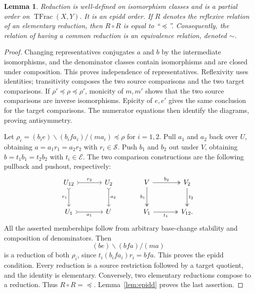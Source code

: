 \documentclass[11pt,reqno,a4paper]{amsart}
\newtheorem{lemma}[theorem]{Lemma}
\theoremstyle{definition}
\theoremstyle{remark}
\newcommand{\0}{\mathbf{0}}
\renewcommand{\1}{\mathbf{1}}
\newcommand{\Sden}{\mathcal S}
\newcommand{\Eden}{\mathcal E}
\DeclareMathOperator{\TFrac}{TFrac}
\begin{document}
\begin{lemma}\label{di:lem:reduction-posets}
Reduction is well-defined on isomorphism classes and is a partial
order on $\TFrac(X,Y)$. It is an epidd order. If $R$ denotes the
reflexive relation of an elementary reduction, then
$R\circ R$ is equal to ``$\preceq$''. Consequently, the relation of having a common reduction is an equivalence relation, denoted $\sim$.
\end{lemma}
\begin{proof}
Changing representatives conjugates $a$ and $b$ by the intermediate
isomorphisms, and the denominator classes contain isomorphisms and
are closed under composition. This proves independence of
representatives. Reflexivity uses identities; transitivity composes
the two source comparisons and the two target comparisons.
If $\rho'\preceq\rho\preceq\rho'$, monicity of $m,m'$ shows that
the two source comparisons are inverse isomorphisms. Epicity of
$e,e'$ gives the same conclusion for the target comparisons.
The numerator equations then identify the diagrams, proving
antisymmetry.

Let $\rho_i=(b_ie)\backslash(b_ifa_i)/(ma_i)\preceq\rho$ for
$i=1,2$. Pull $a_1$ and $a_2$ back over $U$, obtaining
$a=a_1r_1=a_2r_2$ with $r_i\in\Sden$. Push $b_1$ and $b_2$ out
under $V$, obtaining $b=t_1b_1=t_2b_2$ with $t_i\in\Eden$.
The two comparison constructions are the following pullback and
pushout, respectively:
\begin{equation}\label{di:eq:common-reduction-squares}
\begin{tikzcd}[column sep=large,row sep=large]
U_{12}\arrow[r,tail,"r_2"]\arrow[d,tail,"r_1"'] &
 U_2\arrow[d,tail,"a_2"] &
 V\arrow[r,two heads,"b_2"]\arrow[d,two heads,"b_1"'] &
 V_2\arrow[d,two heads,"t_2"]\\
 U_1\arrow[r,tail,"a_1"'] & U &
 V_1\arrow[r,two heads,"t_1"'] & V_{12}.
\end{tikzcd}
\end{equation}
All the asserted memberships follow from arbitrary base-change
stability and composition of denominators. Then
\[
 (be)\backslash(bfa)/(ma)
\]
is a reduction of both $\rho_i$, since
$t_i(b_ifa_i)r_i=bfa$. This proves the epidd condition.
Every reduction is a source restriction followed by a target
quotient, and the identity is elementary. Conversely, two elementary
reductions compose to a reduction. Thus $R\circ R=\preceq$.
Lemma~\ref{lem:epidd} proves the last assertion.
\end{proof}
\end{document}
